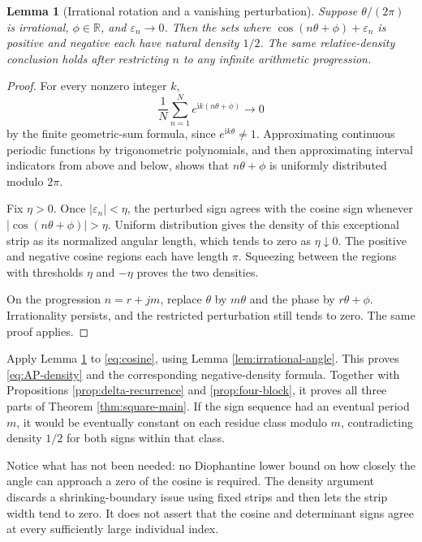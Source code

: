 \documentclass[11pt,letterpaper]{article}
\newtheorem{lemma}[theorem]{Lemma}
\theoremstyle{definition}
\newcommand{\R}{\mathbb R}
\newcommand{\ii}{\mathrm i}
\numberwithin{equation}{section}
\begin{document}
\begin{lemma}[Irrational rotation and a vanishing perturbation]
\label{lem:density}
Suppose $\theta/(2\pi)$ is irrational, $\phi\in\R$, and $\varepsilon_n\to0$.
Then the sets where
$\cos(n\theta+\phi)+\varepsilon_n$ is positive and negative each have
natural density $1/2$. The same relative-density conclusion holds after
restricting $n$ to any infinite arithmetic progression.
\end{lemma}
\begin{proof}
For every nonzero integer $k$,
\[
\frac1N\sum_{n=1}^N e^{\ii k(n\theta+\phi)}\longrightarrow0
\]
by the finite geometric-sum formula, since $e^{\ii k\theta}\ne1$.
Approximating continuous periodic functions by trigonometric polynomials,
and then approximating interval indicators from above and below, shows
that $n\theta+\phi$ is uniformly distributed modulo $2\pi$.

Fix $\eta>0$. Once $|\varepsilon_n|<\eta$, the perturbed sign agrees
with the cosine sign whenever $|\cos(n\theta+\phi)|>\eta$.
Uniform distribution gives the density of this exceptional strip as its
normalized angular length, which tends to zero as $\eta\downarrow0$.
The positive and negative cosine regions each have length $\pi$.
Squeezing between the regions with thresholds $\eta$ and $-\eta$ proves
the two densities.

On the progression $n=r+jm$, replace $\theta$ by $m\theta$ and the phase
by $r\theta+\phi$. Irrationality persists, and the restricted perturbation
still tends to zero. The same proof applies.
\end{proof}

Apply Lemma \ref{lem:density} to \eqref{eq:cosine}, using
Lemma \ref{lem:irrational-angle}. This proves
\eqref{eq:AP-density} and the corresponding negative-density formula.
Together with Propositions \ref{prop:delta-recurrence} and
\ref{prop:four-block}, it proves all three parts of
Theorem \ref{thm:square-main}.
If the sign sequence had an eventual period $m$, it would be eventually
constant on each residue class modulo $m$, contradicting density $1/2$
for both signs within that class.

Notice what has not been needed: no Diophantine lower bound on how closely
the angle can approach a zero of the cosine is required. The density
argument discards a shrinking-boundary issue using fixed strips and then
lets the strip width tend to zero. It does not assert that the cosine
and determinant signs agree at every sufficiently large individual index.
\end{document}

